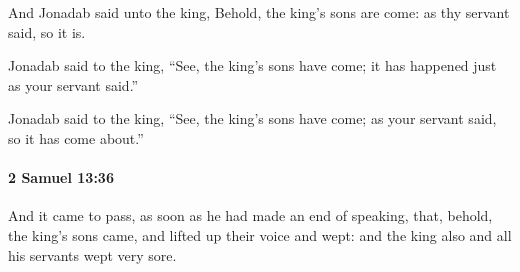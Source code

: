 			\begin{versebox}
					\item[BHS] 
					\item[ASV] And Jonadab said unto the king, Behold, the king's sons are come: as thy servant said, so it is.
					\item[NIV] Jonadab said to the king, “See, the king’s sons have come; it has happened just as your servant said.”
					\item[NRSV] Jonadab said to the king, “See, the king’s sons have come; as your servant said, so it has come about.”
			\end{versebox}

		\paragraph{2 Samuel 13:36} %
			\label{2SAMUEL-13-36}

			And it came to pass, as soon as he had made an end of speaking, that, behold, the king’s sons came, and lifted up their voice and wept: and the king also and all his servants wept very sore.

